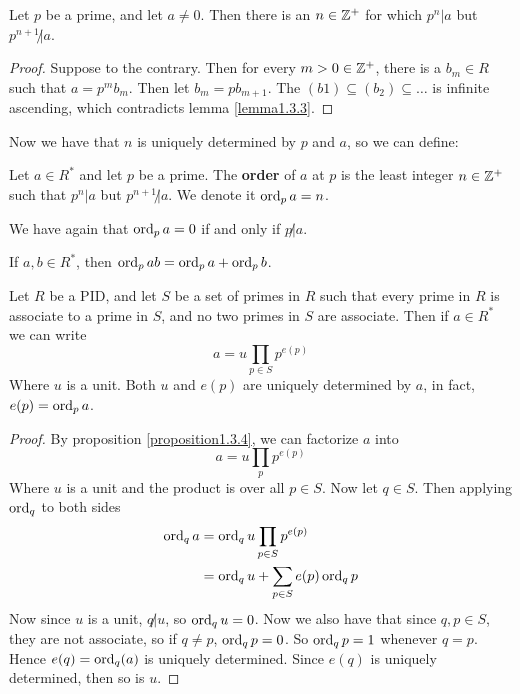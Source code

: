 \begin{lemma}\label{lemma1.3.5}
    Let $p$ be a prime, and let $a \neq 0$. Then there is an $n \in \mathbb{Z}^+$ for which $p^n|a$ but $p^{n+1} \not| a$.
\end{lemma}
\begin{proof}
    Suppose to the contrary. Then for every $m>0 \in \mathbb{Z}^+$, there is a $b_m \in R$ such that $a=p^mb_m$. Then let $b_m=pb_{m+1}$. The $(b1) \subseteq (b_2) \subseteq \dots$ is infinite ascending, which contradicts lemma \ref{lemma1.3.3}. 
\end{proof}

Now we have that $n$ is uniquely determined by $p$ and $a$, so we can define:

\begin{definition}
    Let $a \in R^*$ and let $p$ be a prime. The \textbf{order} of $a$ at $p$ is the least integer $n \in \mathbb{Z}^+$ such that $p^n|a$ but $p^{n+1} \not| a$. We denote it $\operatorname{ord}_p{a}=n$.
\end{definition}

We have again that $\operatorname{ord}_p{a}=0$ if and only if $p \not| a$. 

\begin{lemma}\label{lemma1.3.6}
    If $a,b \in R^*$, then $\operatorname{ord}_p{ab}=\operatorname{ord}_p{a}+\operatorname{ord}_p{b}$. 
\end{lemma}

\begin{theorem}\label{theorem1.3.7}
    Let $R$ be a PID, and let $S$ be a set of primes in $R$ such that every prime in $R$ is associate to a prime in $S$, and no two primes in $S$ are associate. Then if $a \in R^*$ we can write
        \begin{equation}
            a = u \prod_{p \in S} p^{e(p)}
        \end{equation}
    Where $u$ is a unit. Both $u$ and $e(p)$ are uniquely determined by $a$, in fact, $e(p)=\operatorname{ord}_p{a}$.
\end{theorem}
\begin{proof}
    By proposition \ref{proposition1.3.4}, we can factorize $a$ into
        \begin{equation*}
            a= u \prod_{p} p^{e(p)}
        \end{equation*}
    Where $u$ is a unit and the product is over all $p \in S$. Now let $q \in S$. Then applying $\operatorname{ord}_q$ to both sides
        \begin{align*}
            \operatorname{ord}_q{a} &= \operatorname{ord}_q{u \prod_{p \in S} p^{e(p)}} \\
                      &= \operatorname{ord}_q{u}+\sum_{p \in S} e(p)\operatorname{ord}_q{p} \\
        \end{align*}
    Now since $u$ is a unit, $q \not| u$, so $\operatorname{ord}_q{u}=0$. Now we also have that since $q,p \in S$, they are not associate, so if $q \neq p$, $\operatorname{ord}_q{p}=0$. So $\operatorname{ord}_q{p}=1$ whenever $q=p$. Hence $e(q)=\operatorname{ord}_q(a)$ is uniquely determined. Since $e(q)$ is uniquely determined, then so is $u$.
\end{proof}